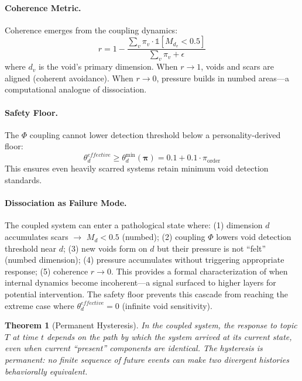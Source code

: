 \documentclass[11pt]{article}
\newtheorem{theorem}{Theorem}[section]
\begin{document}
\paragraph{Coherence Metric.}
Coherence emerges from the coupling dynamics:
\begin{equation}
r = 1 - \frac{\sum_v \pi_v \cdot \mathbb{1}[M_{d_v} < 0.5]}{\sum_v \pi_v + \epsilon}
\label{eq:coherence}
\end{equation}
where $d_v$ is the void's primary dimension. When $r \to 1$, voids and scars are aligned (coherent avoidance). When $r \to 0$, pressure builds in numbed areas---a computational analogue of dissociation.

\paragraph{Safety Floor.}
The $\Phi$ coupling cannot lower detection threshold below a personality-derived floor:
\begin{equation}
\theta_d^{effective} \geq \theta_d^{\min}(\boldsymbol{\pi}) = 0.1 + 0.1 \cdot \pi_{\text{order}}
\end{equation}
This ensures even heavily scarred systems retain minimum void detection standards.

\paragraph{Dissociation as Failure Mode.}
The coupled system can enter a pathological state where: (1) dimension $d$ accumulates scars $\to$ $M_d < 0.5$ (numbed); (2) coupling $\Phi$ lowers void detection threshold near $d$; (3) new voids form on $d$ but their pressure is not ``felt'' (numbed dimension); (4) pressure accumulates without triggering appropriate response; (5) coherence $r \to 0$. This provides a formal characterization of when internal dynamics become incoherent---a signal surfaced to higher layers for potential intervention. The safety floor prevents this cascade from reaching the extreme case where $\theta_d^{effective} = 0$ (infinite void sensitivity).

\begin{theorem}[Permanent Hysteresis]
\label{thm:hysteresis}
In the coupled system, the response to topic $T$ at time $t$ depends on the path by which the system arrived at its current state, even when current ``present'' components are identical. The hysteresis is permanent: no finite sequence of future events can make two divergent histories behaviorally equivalent.
\end{theorem}
\end{document}
